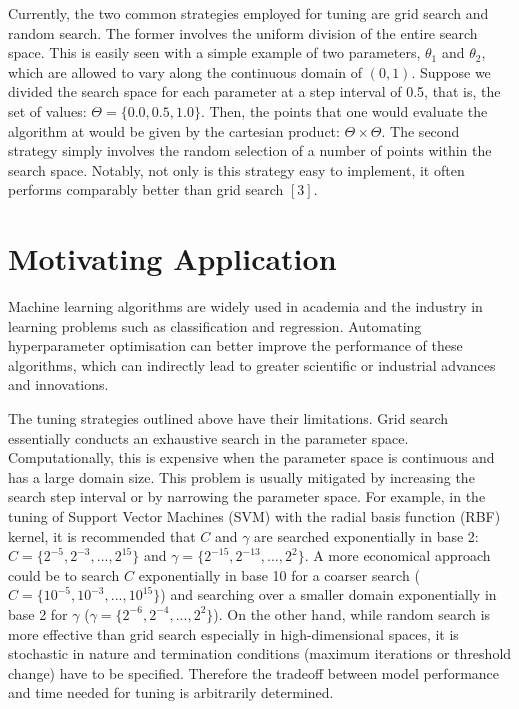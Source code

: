 \documentclass[letterpaper]{article}
\begin{document}
Currently, the two common strategies employed for tuning are grid search and
random search. The former involves the uniform division of the entire search
space. This is easily seen with a simple example of two parameters, $\theta_1$ and
$\theta_2$, which are allowed to vary along the continuous domain of $(0, 1)$.
Suppose we divided the search space for each parameter at a step interval of 0.5,
that is, the set of values: $\Theta=\{0.0, 0.5, 1.0\}$. Then, the points that one
would evaluate the algorithm at would be given by the cartesian product: $\Theta \times \Theta$.
The second strategy simply involves the random selection of a number of points
within the search space. Notably, not only is this strategy easy to implement, it
often performs comparably better than grid search $[3]$.

\section{Motivating Application}
Machine learning algorithms are widely used in academia and the industry in learning
problems such as classification and regression. Automating hyperparameter optimisation
can better improve the performance of these algorithms, which can indirectly lead
to greater scientific or industrial advances and innovations.

The tuning strategies outlined above have their limitations. Grid search essentially
conducts an exhaustive search in the parameter space. Computationally, this is expensive
when the parameter space is continuous and has a large domain size. This problem
is usually mitigated by increasing the search step interval
or by narrowing the parameter space. For example, in the tuning of Support Vector Machines
(SVM) with the radial basis function (RBF) kernel, it is recommended that $\textit{C}$ and $\gamma$ are searched
exponentially in base 2: $\textit{C}=\{2^{-5},2^{-3},...,2^{15}\}$ and
$\gamma=\{2^{-15},2^{-13},...,2^{2}\}$. A more economical approach could be to search
$\textit{C}$ exponentially in base 10 for a coarser search
($\textit{C}=\{10^{-5},10^{-3},...,10^{15}\}$) and searching over a smaller domain
exponentially in base 2 for $\gamma$ ($\gamma=\{2^{-6},2^{-4},...,2^{2}\}$). On the other hand, while random
search is more effective than grid search especially in high-dimensional spaces,
it is stochastic in nature and termination conditions (maximum iterations or threshold change)
have to be specified. Therefore the tradeoff between model performance and time needed
for tuning is arbitrarily determined.
\end{document}
